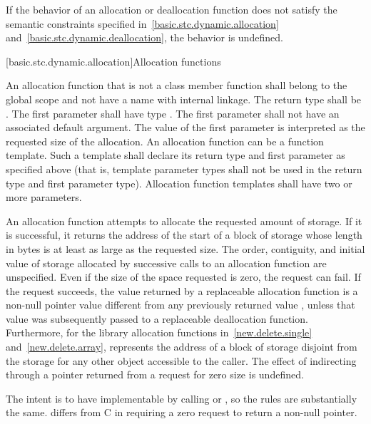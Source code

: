\pnum
If the behavior of an allocation or deallocation function
does not satisfy the semantic constraints
specified in~\ref{basic.stc.dynamic.allocation}
and~\ref{basic.stc.dynamic.deallocation},
the behavior is undefined.


[basic.stc.dynamic.allocation]{Allocation functions}

\pnum
{}%
An allocation function that is not a class member function
shall belong to the global scope and not have a name with internal linkage.
The return type shall be . The first
parameter shall have type . The
first parameter shall not have an associated default
argument. The value of the first parameter
is interpreted as the requested size of the allocation. An allocation
function can be a function template. Such a template shall declare its
return type and first parameter as specified above (that is, template
parameter types shall not be used in the return type and first parameter
type). Allocation function templates shall have two or more parameters.

\pnum
An allocation function attempts to allocate the requested amount of
storage. If it is successful, it returns the address of the start
of a block of storage whose length in bytes is at least as large
as the requested size.
The order,
contiguity, and initial value of storage allocated by successive calls
to an allocation function are unspecified.
Even if the size of the space
requested is zero, the request can fail. If the request succeeds, the
value returned by a replaceable allocation function
is a non-null pointer value
 different from any previously returned value ,
unless that value  was subsequently passed to a
replaceable deallocation function.
Furthermore, for the library allocation functions
in~\ref{new.delete.single} and~\ref{new.delete.array},
 represents the address of a block of storage disjoint from the storage
for any other object accessible to the caller.
The effect of indirecting through a pointer
returned from a request for zero size is undefined.
\begin{footnote}
The intent is
to have  implementable by
calling  or , so the rules are
substantially the same. \Cpp{} differs from C in requiring a zero request
to return a non-null pointer.
\end{footnote}

